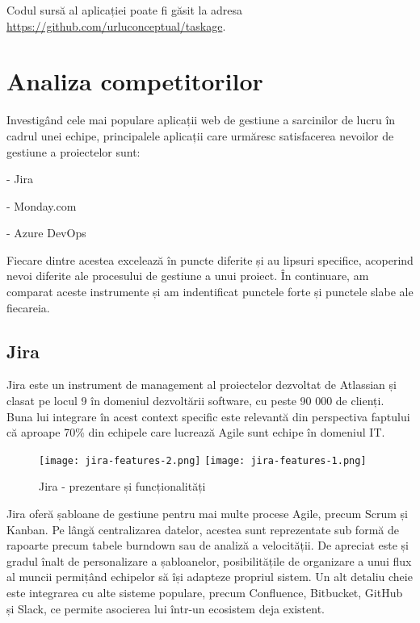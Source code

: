 Codul sursă al aplicației poate fi găsit la adresa \url{https://github.com/urluconceptual/taskage}.

\section{Analiza competitorilor}

Investigând cele mai populare aplicații web de gestiune a sarcinilor de lucru în cadrul unei echipe, principalele aplicații care urmăresc satisfacerea nevoilor de gestiune a proiectelor sunt:

- Jira

- Monday.com

- Azure DevOps

Fiecare dintre acestea excelează în puncte diferite și au lipsuri specifice, acoperind nevoi diferite ale procesului de gestiune a unui proiect. În continuare, am comparat aceste instrumente și am indentificat punctele forte și punctele slabe ale fiecareia.

\subsection{Jira}

Jira este un instrument de management al proiectelor dezvoltat de Atlassian și clasat pe locul 9 în domeniul dezvoltării software, cu peste 90 000 de clienți\cite{6sense-jira}. Buna lui integrare în acest context specific este relevantă din perspectiva faptului că aproape 70\% din echipele care lucrează Agile sunt echipe în domeniul IT\cite{annual-state-of-agile-report}. 

 \begin{figure}[H]
 	 \texttt{[image: jira-features-2.png]}
	\texttt{[image: jira-features-1.png]}
	\caption{Jira - prezentare și funcționalități \cite{jira-features}}
	\label{fig:jira-features}
 \end{figure}

Jira oferă șabloane de gestiune pentru mai multe procese Agile, precum Scrum și Kanban. Pe lângă centralizarea datelor, acestea sunt reprezentate sub formă de rapoarte precum tabele burndown sau de analiză a velocității. De apreciat este și gradul înalt de personalizare a șabloanelor, posibilitățile de organizare a unui flux al muncii permițând echipelor să își adapteze propriul sistem. Un alt detaliu cheie este integrarea cu alte sisteme populare, precum Confluence, Bitbucket, GitHub și Slack, ce permite asocierea lui într-un ecosistem deja existent.

